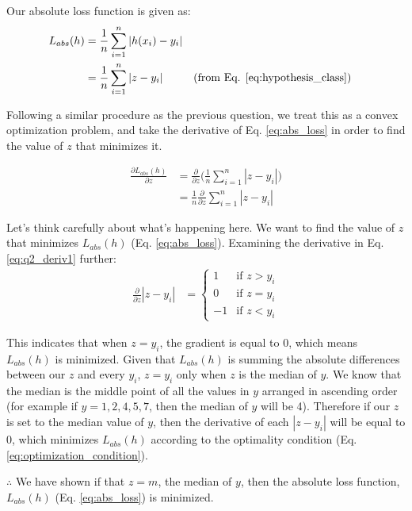 Our absolute loss function is given as:
\begin{align}
    L_{abs}(h) &= \frac{1}{n} \sum_{i=1}^n |h(x_i)-y_i| \label{eq:abs_loss} \nonumber \\
    &= \frac{1}{n} \sum_{i=1}^n |z-y_i| && \text{(from Eq. \ref{eq:hypothesis_class})}
\end{align}

Following a similar procedure as the previous question, we treat this as a convex optimization problem, and take the derivative of Eq. \ref{eq:abs_loss} in order to find the value of $z$ that minimizes it.

\begin{align}
    \frac{\partial L_{abs}(h)}{\partial z} &= \frac{\partial}{\partial z} \Big(\frac{1}{n} \sum_{i=1}^n |z-y_i| \Big) \nonumber \label{eq:q2_deriv1} \\
    &= \frac{1}{n} \frac{\partial}{\partial z} \sum_{i=1}^n |z-y_i|
\end{align}

Let's think carefully about what's happening here. We want to find the value of $z$ that minimizes $L_{abs}(h)$ (Eq. \ref{eq:abs_loss}). Examining the derivative in Eq. \ref{eq:q2_deriv1} further:
\begin{align}
    \frac{\partial}{\partial z} |z-y_i| &= \begin{cases} 
        1 & \text{if } z > y_i \\
        0 & \text{if } z = y_i \\
        -1 & \text{if } z < y_i
    \end{cases} \nonumber \label{eq:q2_deriv2} 
\end{align}

This indicates that when $z=y_i$, the gradient is equal to 0, which means $L_{abs}(h)$ is minimized. Given that $L_{abs}(h)$ is summing the absolute differences between our $z$ and every $y_i$, $z=y_i$ only when $z$ is the median of $y$. We know that the median is the middle point of all the values in $y$ arranged in ascending order (for example if $y={1,2,4,5,7}$, then the median of $y$ will be 4). Therefore if our $z$ is set to the median value of $y$, then the derivative of each $|z-y_i|$ will be equal to 0, which minimizes $L_{abs}(h)$ according to the optimality condition (Eq. \ref{eq:optimization_condition}).

$\therefore$ We have shown if that $z = m$, the median of $y$, then the absolute loss function, $L_{abs}(h)$ (Eq. \ref{eq:abs_loss}) is minimized.

